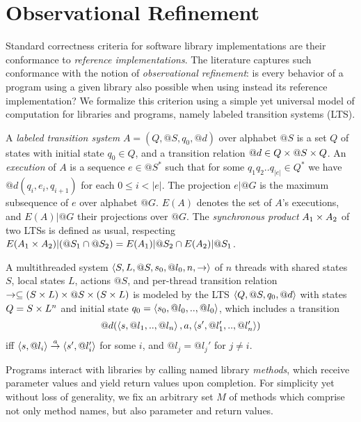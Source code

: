\section{Observational Refinement}

Standard correctness criteria for software library implementations are their
conformance to \emph{reference implementations}. The literature captures such
conformance with the notion of \emph{observational refinement}: is every
behavior of a program using a given library also possible when using instead
its reference implementation? We formalize this criterion using a simple yet
universal model of computation for libraries and programs, namely labeled
transition systems (LTS).

A \emph{labeled transition system} $A = (Q,@S,q_0,@d)$ over alphabet $@S$ is a
set $Q$ of states with initial state $q_0 \in Q$, and a transition relation $@d
\in Q \times @S \times Q$. An \emph{execution} of $A$ is a sequence $e \in @S^*$ such
that for some $q_1 q_2 .. q_{|e|} \in Q^*$ we have $@d(q_i,e_i,q_{i+1})$ for
each $0 \le i < |e|$. The projection $e|@G$ is the maximum subsequence of $e$
over alphabet $@G$. $E(A)$ denotes the set of $A$'s executions, and $E(A)|@G$
their projections over $@G$. The \emph{synchronous product} $A_1 \times A_2$ of two
LTSs is defined as usual, respecting $E(A_1 \times A_2)|(@S_1 \cap @S_2) =
E(A_1)|@S_2 \cap E(A_2)|@S_1$.

\begin{example}
  \label{ex:threads:1}

  A multithreaded system $\left\langle {S,L,@S,s_0,@l_0,n,->} \right\rangle$ of $n$ threads with
  shared states $S$, local states $L$, actions $@S$, and per-thread transition
  relation $-> \subseteq (S \times L) \times @S \times (S \times L)$ is modeled by the LTS
  $\left\langle {Q,@S,q_0,@d} \right\rangle$ with states $Q = S \times L^n$ and initial state $q_0 =
  \left\langle {s_0, @l_0, .., @l_0} \right\rangle$, which includes a transition
  \begin{align*}
    @d(\left\langle {s, @l_1, .., @l_n} \right\rangle, a, \left\langle {s', @l_1', .., @l_n'} \right\rangle)
  \end{align*}
  iff $\left\langle {s,@l_i} \right\rangle \overset{a}{\rightarrow} \left\langle {s',@l_i'} \right\rangle$ for some $i$, and
  $@l_j = @l_j'$ for $j \neq i$.

\end{example}

Programs interact with libraries by calling named library \emph{methods}, which
receive parameter values and yield return values upon completion. For
simplicity yet without loss of generality, we fix an arbitrary set $M$ of
methods which comprise not only method names, but also parameter and return
values.

